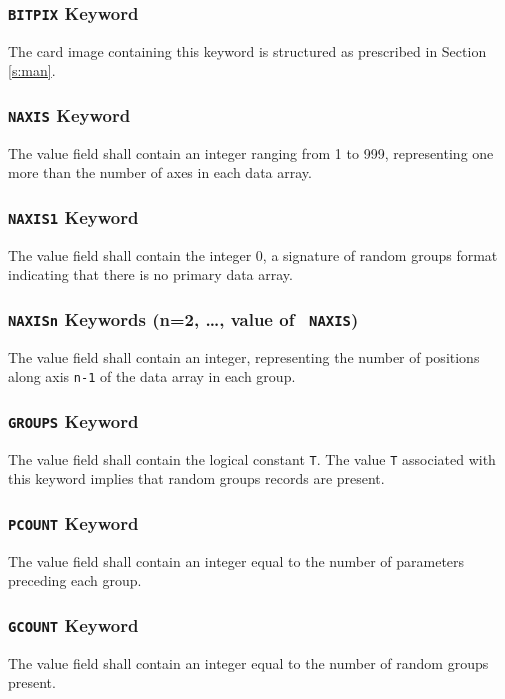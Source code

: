    \subsubsection{{\tt BITPIX} Keyword}
   The card image containing this keyword is structured as 
   prescribed in
   Section \ref{s:man}.
  
   \subsubsection{{\tt NAXIS} Keyword}
   The value field shall contain an integer ranging from 1 to
   999, representing one more than the number of axes in each
   data array.
  
   \subsubsection{{\tt NAXIS1} Keyword}
   The value field shall contain the integer 0, a signature of
   random groups format indicating that there is no 
   primary data array.
  
   \subsubsection{{\tt NAXISn} Keywords (n=2, \ldots, value of {\tt
NAXIS})}
   The value field shall contain an integer, representing 
   the number of positions along axis {\tt n-1} of the 
   data array in each group.
  
   \subsubsection{{\tt GROUPS} Keyword}
   The value field shall contain the logical constant {\tt T}. 
   The
   value {\tt T} associated with this keyword implies that random groups 
   records are present.
  
   \subsubsection{{\tt PCOUNT} Keyword}
   The value field shall contain an integer equal to the
number
   of parameters preceding each group.
  
   \subsubsection{{\tt GCOUNT} Keyword}
   The value field shall contain an integer equal to the
   number of random groups present.
  
